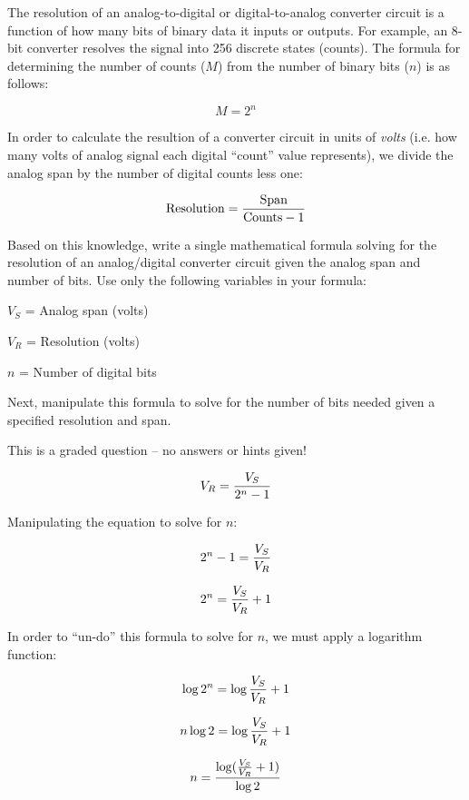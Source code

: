

The resolution of an analog-to-digital or digital-to-analog converter circuit is a function of how many bits of binary data it inputs or outputs.  For example, an 8-bit converter resolves the signal into 256 discrete states (counts).  The formula for determining the number of counts ($M$) from the number of binary bits ($n$) is as follows:

$$M = 2^n$$

In order to calculate the resultion of a converter circuit in units of {\it volts} (i.e. how many volts of analog signal each digital ``count'' value represents), we divide the analog span by the number of digital counts less one:

$$\hbox{Resolution} = {\hbox{Span} \over {\hbox{Counts} - 1}}$$

\vskip 10pt

Based on this knowledge, write a single mathematical formula solving for the resolution of an analog/digital converter circuit given the analog span and number of bits.  Use only the following variables in your formula:

\vskip 10pt

$V_S$ = Analog span (volts)

$V_R$ = Resolution (volts)

$n$ = Number of digital bits

\vskip 100pt

Next, manipulate this formula to solve for the number of bits needed given a specified resolution and span.

\vfil

\eject






This is a graded question -- no answers or hints given!
 






$$V_R = {V_S \over 2^n - 1}$$

\vskip 10pt

Manipulating the equation to solve for $n$:

$$2^n - 1 = {V_S \over V_R}$$

$$2^n = {V_S \over V_R} + 1$$

In order to ``un-do'' this formula to solve for $n$, we must apply a logarithm function:

$$\log 2^n = \log {V_S \over V_R} + 1$$

$$n \log 2 = \log {V_S \over V_R} + 1$$

$$n = {{\log ({V_S \over V_R} + 1)} \over {\log 2}}$$




